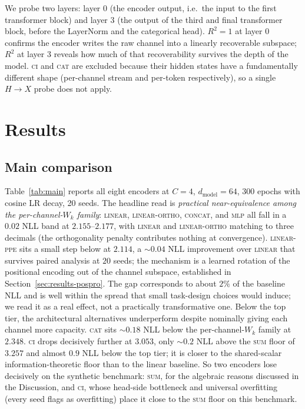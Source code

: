 \documentclass[11pt]{article}
\begin{document}
We probe two layers: layer 0 (the encoder output, i.e.\ the input to
the first transformer block) and layer 3 (the output of the third and
final transformer block, before the LayerNorm and the categorical
head). $R^2 = 1$ at layer 0 confirms the encoder writes the raw
channel into a linearly recoverable subspace; $R^2$ at layer 3 reveals
how much of that recoverability survives the depth of the model.
\textsc{ci} and \textsc{cat} are excluded because their hidden states
have a fundamentally different shape (per-channel stream and per-token
respectively), so a single $H \to X$ probe does not apply.

\section{Results}

\subsection{Main comparison}
\label{sec:results-main}



Table~\ref{tab:main} reports all eight encoders at $C{=}4$,
$d_{\text{model}}{=}64$, 300 epochs with cosine LR decay, 20 seeds.
The headline read is \emph{practical near-equivalence among the
per-channel-$W_k$ family}: \textsc{linear}, \textsc{linear-ortho},
\textsc{concat}, and \textsc{mlp} all fall in a $0.02$ NLL band at
$2.155$--$2.177$, with \textsc{linear} and \textsc{linear-ortho}
matching to three decimals (the orthogonality penalty contributes
nothing at convergence). \textsc{linear-ppe} sits a small step
below at $2.114$, a ${\sim}0.04$ NLL improvement over
\textsc{linear} that survives paired analysis at $20$ seeds; the
mechanism is a learned rotation of the positional encoding out of
the channel subspace, established in
Section~\ref{sec:results-pospro}. The gap corresponds to about
$2\%$ of the baseline NLL and is well within the spread that
small task-design choices would induce; we read it as a real
effect, not a practically transformative one. Below the top tier, the architectural alternatives underperform
despite nominally giving each channel more capacity. \textsc{cat}
sits ${\sim}0.18$ NLL below the per-channel-$W_k$ family at
$2.348$. \textsc{ci} drops decisively further at $3.053$, only
${\sim}0.2$ NLL above the \textsc{sum} floor of $3.257$ and almost
$0.9$ NLL below the top tier; it is closer to the shared-scalar
information-theoretic floor than to the linear baseline. So two
encoders lose decisively on the synthetic benchmark:
\textsc{sum}, for the algebraic reasons discussed in the
Discussion, and \textsc{ci}, whose head-side bottleneck and
universal overfitting (every seed flags as overfitting) place
it close to the \textsc{sum} floor on this benchmark.
\end{document}
